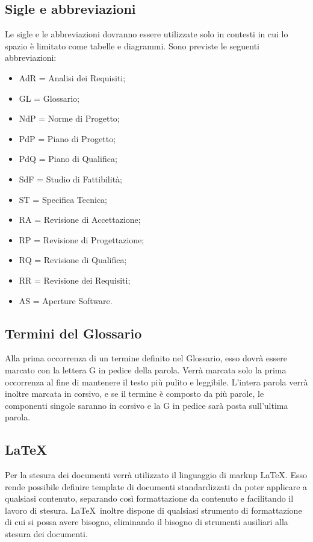 \subsection{Sigle e abbreviazioni}
\label{5.5}
Le sigle e le abbreviazioni dovranno essere utilizzate solo in contesti in cui lo spazio è limitato come tabelle e diagrammi. Sono previste le seguenti abbreviazioni:
\begin{itemize}
\item AdR = Analisi dei Requisiti;
\item GL = Glossario;
\item NdP = Norme di Progetto;
\item PdP = Piano di Progetto;
\item PdQ = Piano di Qualifica;
\item SdF = Studio di Fattibilità;
\item ST = Specifica Tecnica;
\item RA = Revisione di Accettazione;
\item RP = Revisione di Progettazione;
\item RQ = Revisione di Qualifica;
\item RR = Revisione dei Requisiti;
\item AS = Aperture Software.
\end{itemize}

\subsection{Termini del Glossario}
\label{5.6}
Alla prima occorrenza di un termine definito nel Glossario, esso dovrà essere marcato con la lettera G in pedice della parola. Verrà marcata solo la prima occorrenza al fine di mantenere il testo più pulito e leggibile. L'intera parola verrà inoltre marcata in corsivo, e se il termine è composto da più parole, le componenti singole saranno in corsivo e la G in pedice sarà posta sull'ultima parola.

\subsection{LaTeX}
\label{5.7}
Per la stesura dei documenti verrà utilizzato il linguaggio di markup \LaTeX. Esso rende possibile definire template di documenti standardizzati da poter applicare a qualsiasi contenuto, separando così formattazione da contenuto e facilitando il lavoro di stesura. \LaTeX\ inoltre dispone di qualsiasi strumento di formattazione di cui si possa avere bisogno, eliminando il bisogno di strumenti ausiliari alla stesura dei documenti.


